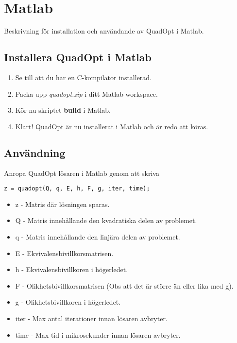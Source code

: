 \section{Matlab}
Beskrivning för installation och användande av QuadOpt i Matlab.

\subsection{Installera QuadOpt i Matlab}
\begin{enumerate}
	\item Se till att du har en C-kompilator installerad.
	\item Packa upp \emph{quadopt.zip} i ditt Matlab workspace.
	\item Kör nu skriptet \textbf{build} i Matlab.
	\item Klart! QuadOpt är nu installerat i Matlab och är redo att köras.
\end{enumerate}

\subsection{Användning}
Anropa QuadOpt lösaren i Matlab genom att skriva

\begin{lstlisting}
z = quadopt(Q, q, E, h, F, g, iter, time);
\end{lstlisting}

\begin{itemize}
	\item z - Matris där lösningen sparas.
	\item Q - Matris innehållande den kvadratiska delen av problemet.
	\item q - Matris innehållande den linjära delen av problemet.
	\item E - Ekvivalensbivillkorsmatrisen.
	\item h - Ekvivalensbivillkoren i högerledet.
	\item F - Olikhetsbivillkorsmatrisen (Obs att det är större än eller lika med g).
	\item g - Olikhetsbivillkoren i högerledet.
	\item iter - Max antal iterationer innan lösaren avbryter.
	\item time - Max tid i mikrosekunder innan lösaren avbryter.
\end{itemize}
